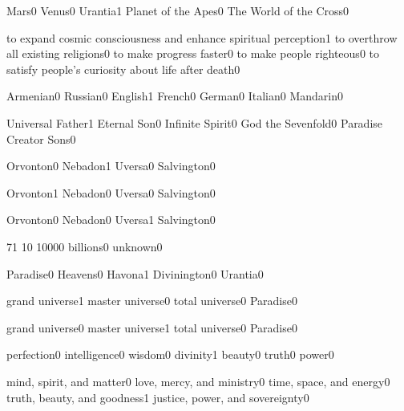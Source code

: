 \quizheader


{Mars}{0}
{Venus}{0}
{Urantia}{1}
{Planet of the Apes}{0}
{The World of the Cross}{0}
\qstop

{to expand cosmic consciousness and enhance spiritual perception}{1}
{to overthrow all existing religions}{0}
{to make progress faster}{0}
{to make people righteous}{0}
{to satisfy people's curiosity about life after death}{0}
\qstop

{Armenian}{0}
{Russian}{0}
{English}{1}
{French}{0}
{German}{0}
{Italian}{0}
{Mandarin}{0}
\qstop

{Universal Father}{1}
{Eternal Son}{0}
{Infinite Spirit}{0}
{God the Sevenfold}{0}
{Paradise Creator Sons}{0}
\qstop

{Orvonton}{0}
{Nebadon}{1}
{Uversa}{0}
{Salvington}{0}
\qstop

{Orvonton}{1}
{Nebadon}{0}
{Uversa}{0}
{Salvington}{0}
\qstop

{Orvonton}{0}
{Nebadon}{0}
{Uversa}{1}
{Salvington}{0}
\qstop

{7}{1}
{1}{0}
{1000}{0}
{billions}{0}
{unknown}{0}
\qstop

{Paradise}{0}
{Heavens}{0}
{Havona}{1}
{Divinington}{0}
{Urantia}{0}
\qstop

{grand universe}{1}
{master universe}{0}
{total universe}{0}
{Paradise}{0}
\qstop

{grand universe}{0}
{master universe}{1}
{total universe}{0}
{Paradise}{0}
\qstop

{perfection}{0}
{intelligence}{0}
{wisdom}{0}
{divinity}{1}
{beauty}{0}
{truth}{0}
{power}{0}
\qstop

{mind, spirit, and matter}{0}
{love, mercy, and ministry}{0}
{time, space, and energy}{0}
{truth, beauty, and goodness}{1}
{justice, power, and sovereignty}{0}
\qstop

